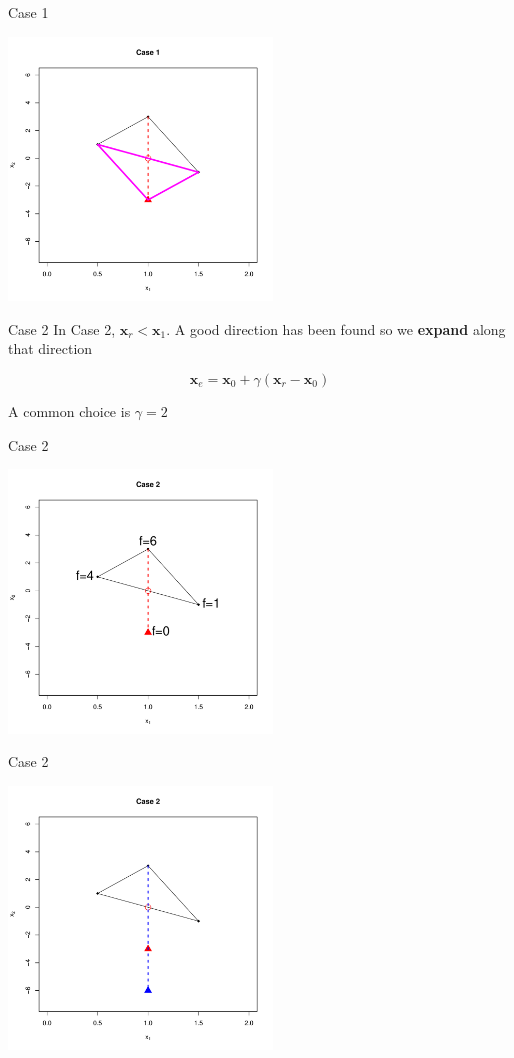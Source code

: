 \documentclass[10pt]{beamer}
\begin{document}
\begin{frame}{Case 1}
  \begin{center}
    \includegraphics[height=7cm]{RCode/nmrefl3.pdf}
  \end{center}
\end{frame}
\begin{frame}{Case 2}
  In Case 2, ${\bm x_r}<{\bm x_1}$. A good direction has been found so we {\bf expand} along that direction

  \begin{equation}
    {\bm x_e}={\bm x_0}+\gamma({\bm x_r}-{\bm x_0})
  \end{equation}

  A common choice is $\gamma=2$
\end{frame}
\begin{frame}{Case 2}
  \begin{center}
    \includegraphics[height=7cm]{RCode/nmexpansion1.pdf}
  \end{center}
\end{frame}
\begin{frame}{Case 2}
  \begin{center}
    \includegraphics[height=7cm]{RCode/nmexpansion2.pdf}
  \end{center}
\end{frame}
\end{document}
